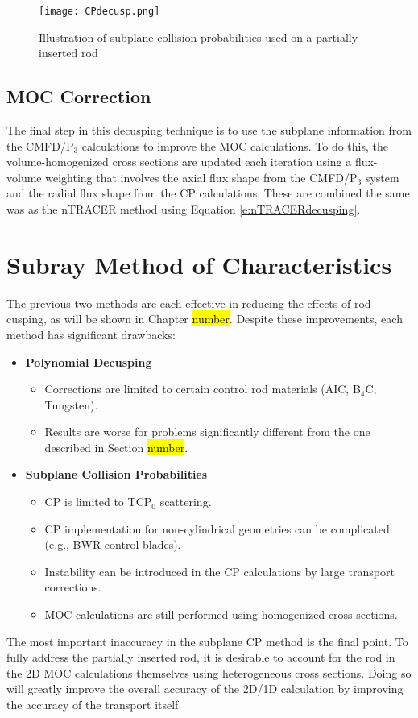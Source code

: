 \begin{figure}
    \centering
    \texttt{[image: CPdecusp.png]}
    \caption{Illustration of subplane collision probabilities used on a partially inserted rod}\label{f:SCPdecusping}
\end{figure}

\subsection{MOC Correction}

The final step in this decusping technique is to use the subplane information from the CMFD/P$_3$ calculations to improve the MOC calculations.  To do this, the volume-homogenized cross sections are updated each iteration using a flux-volume weighting that involves the axial flux shape from the CMFD/P$_3$ system and the radial flux shape from the CP calculations.  These are combined the same was as the nTRACER method using Equation \ref{e:nTRACERdecusping}.

\section{Subray Method of Characteristics}

The previous two methods are each effective in reducing the effects of rod cusping, as will be shown in Chapter \hl{number}.  Despite these improvements, each method has significant drawbacks:
\begin{itemize}[leftmargin=*]
    \item \textbf{Polynomial Decusping}
    
    \begin{itemize}
        \item Corrections are limited to certain control rod materials (AIC, B$_4$C, Tungsten).
        \item Results are worse for problems significantly different from the one described in Section \hl{number}.
    \end{itemize}

    \item \textbf{Subplane Collision Probabilities}
    
    \begin{itemize}
        \item CP is limited to TCP$_0$ scattering.
        \item CP implementation for non-cylindrical geometries can be complicated (e.g., BWR control blades).
        \item Instability can be introduced in the CP calculations by large transport corrections.
        \item MOC calculations are still performed using homogenized cross sections.
    \end{itemize}
\end{itemize}
The most important inaccuracy in the subplane CP method is the final point.  To fully address the partially inserted rod, it is desirable to account for the rod in the 2D MOC calculations themselves using heterogeneous cross sections.  Doing so will greatly improve the overall accuracy of the 2D/1D calculation by improving the accuracy of the transport itself.

